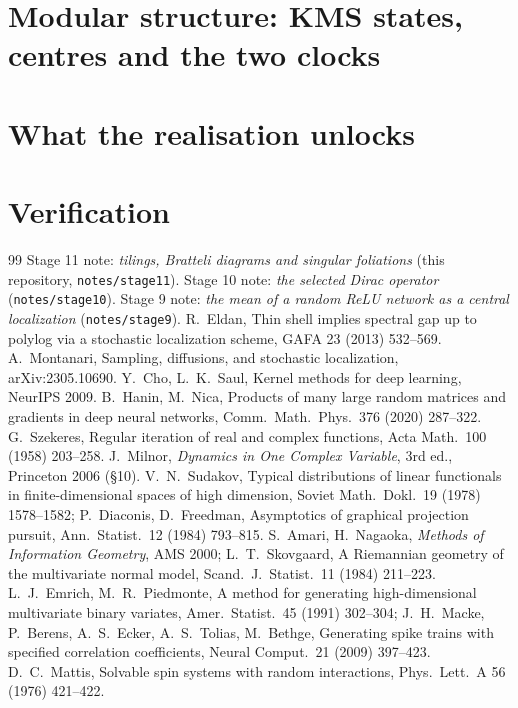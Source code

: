 \documentclass[11pt]{article}
\theoremstyle{plain}
\theoremstyle{definition}\newtheorem{definition}[theorem]{Definition}\newtheorem{remark}[theorem]{Remark}
\begin{document}
\section{Modular structure: KMS states, centres and the two clocks}

\section{What the realisation unlocks}

\section*{Verification}

\begin{thebibliography}{99}\small
{} Stage 11 note: \emph{tilings, Bratteli diagrams and singular foliations} (this repository, \texttt{notes/stage11}).
 Stage 10 note: \emph{the selected Dirac operator} (\texttt{notes/stage10}).
 Stage 9 note: \emph{the mean of a random ReLU network as a central localization} (\texttt{notes/stage9}).
 R.~Eldan, Thin shell implies spectral gap up to polylog via a stochastic localization scheme, GAFA 23 (2013) 532--569.
 A.~Montanari, Sampling, diffusions, and stochastic localization, arXiv:2305.10690.
 Y.~Cho, L.~K.~Saul, Kernel methods for deep learning, NeurIPS 2009.
 B.~Hanin, M.~Nica, Products of many large random matrices and gradients in deep neural networks, Comm.~Math.~Phys.~376 (2020) 287--322.
 G.~Szekeres, Regular iteration of real and complex functions, Acta Math.~100 (1958) 203--258.
 J.~Milnor, \emph{Dynamics in One Complex Variable}, 3rd ed., Princeton 2006 (\S10).
 V.~N.~Sudakov, Typical distributions of linear functionals in finite-dimensional spaces of high dimension, Soviet Math.~Dokl.~19 (1978) 1578--1582;
P.~Diaconis, D.~Freedman, Asymptotics of graphical projection pursuit, Ann.~Statist.~12 (1984) 793--815.
 S.~Amari, H.~Nagaoka, \emph{Methods of Information Geometry}, AMS 2000; L.~T.~Skovgaard, A Riemannian geometry of the multivariate normal model, Scand.~J.~Statist.~11 (1984) 211--223.
 L.~J.~Emrich, M.~R.~Piedmonte, A method for generating high-dimensional multivariate binary variates, Amer.~Statist.~45 (1991) 302--304;
J.~H.~Macke, P.~Berens, A.~S.~Ecker, A.~S.~Tolias, M.~Bethge, Generating spike trains with specified correlation coefficients, Neural Comput.~21 (2009) 397--423.
 D.~C.~Mattis, Solvable spin systems with random interactions, Phys.~Lett.~A 56 (1976) 421--422.

\end{thebibliography}
\end{document}
